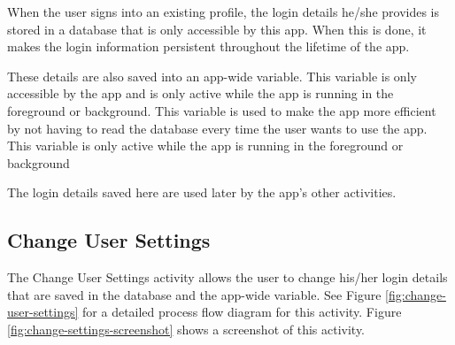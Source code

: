 When the user signs into an existing profile, the login details he/she provides
is stored in a database that is only accessible by this app. When this is done, it
makes the login information persistent throughout the lifetime of the app.

These details are also saved into an app-wide variable. This variable is
only accessible by the app and is only active while the app is running in
the foreground or background. This variable is used to make the app more
efficient by not having to read the database every time the user wants to use
the app. This variable is only active while the app is running in the foreground
or background

The login details saved here are used later by the app's other activities.

\subsection{Change User Settings}

The Change User Settings activity allows the user to change his/her login
details that are saved in the database and the app-wide variable. See Figure
\ref{fig:change-user-settings} for a detailed process flow diagram for this
activity. Figure \ref{fig:change-settings-screenshot} shows a screenshot of this
activity.

